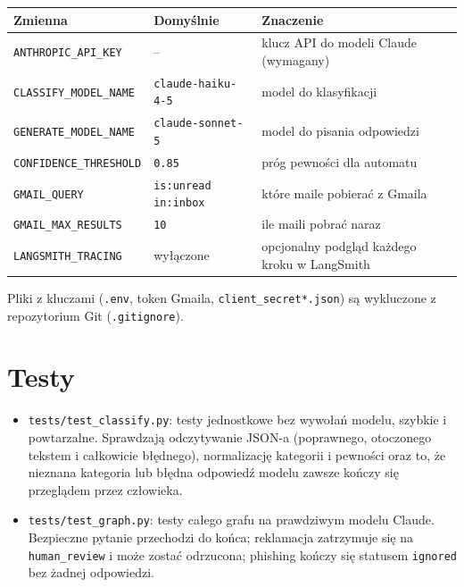 \documentclass[11pt,a4paper]{article}
\newcommand{\plik}[1]{\texttt{#1}}
\begin{document}
\begin{center}
\renewcommand{\arraystretch}{1.2}
\begin{tabularx}{\textwidth}{@{}l l X@{}}
\toprule
\textbf{Zmienna} & \textbf{Domyślnie} & \textbf{Znaczenie} \\
\midrule
\texttt{ANTHROPIC\_API\_KEY} & -- & klucz API do modeli Claude (wymagany) \\
\texttt{CLASSIFY\_MODEL\_NAME} & \texttt{claude-haiku-4-5} & model do klasyfikacji \\
\texttt{GENERATE\_MODEL\_NAME} & \texttt{claude-sonnet-5} & model do pisania odpowiedzi \\
\texttt{CONFIDENCE\_THRESHOLD} & \texttt{0.85} & próg pewności dla automatu \\
\texttt{GMAIL\_QUERY} & \texttt{is:unread in:inbox} & które maile pobierać z Gmaila \\
\texttt{GMAIL\_MAX\_RESULTS} & \texttt{10} & ile maili pobrać naraz \\
\texttt{LANGSMITH\_TRACING} & wyłączone & opcjonalny podgląd każdego kroku w LangSmith \\
\bottomrule
\end{tabularx}
\end{center}

Pliki z kluczami (\plik{.env}, token Gmaila, \plik{client\_secret*.json})
są wykluczone z repozytorium Git (\plik{.gitignore}).

\section{Testy}

\begin{itemize}
  \item \plik{tests/test\_classify.py}: testy jednostkowe bez wywołań
        modelu, szybkie i powtarzalne. Sprawdzają odczytywanie JSON-a
        (poprawnego, otoczonego tekstem i całkowicie błędnego), normalizację
        kategorii i pewności oraz to, że nieznana kategoria lub błędna
        odpowiedź modelu zawsze kończy się przeglądem przez człowieka.
  \item \plik{tests/test\_graph.py}: testy całego grafu na prawdziwym
        modelu Claude. Bezpieczne pytanie przechodzi do końca; reklamacja
        zatrzymuje się na \texttt{human\_review} i może zostać odrzucona;
        phishing kończy się statusem \texttt{ignored} bez żadnej odpowiedzi.
\end{itemize}
\end{document}
